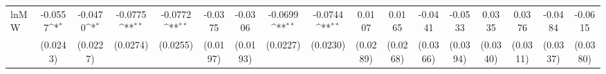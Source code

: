 {
\def\sym#1{\ifmmode^{#1}\else\(^{#1}\)\fi}
\begin{tabular}{l*{16}{c}}
\hline\hline
\hline
lnMW                &     -0.0557\sym{*}  &     -0.0470\sym{*}  &     -0.0775\sym{**} &     -0.0772\sym{**} &     -0.0375         &     -0.0306         &     -0.0699\sym{**} &     -0.0744\sym{**} &      0.0107         &      0.0165         &     -0.0441         &     -0.0533         &      0.0335         &      0.0376         &     -0.0484         &     -0.0615         \\
                    &    (0.0243)         &    (0.0227)         &    (0.0274)         &    (0.0255)         &    (0.0197)         &    (0.0193)         &    (0.0227)         &    (0.0230)         &    (0.0289)         &    (0.0268)         &    (0.0366)         &    (0.0394)         &    (0.0340)         &    (0.0311)         &    (0.0337)         &    (0.0380)         \\
\hline\hline
\end{tabular}
}

